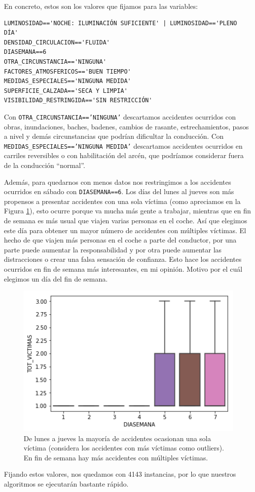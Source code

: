 \documentclass[oneside]{book}
\begin{document}
En concreto, estos son los valores que fijamos para las variables:

\begin{verbatim}
LUMINOSIDAD=='NOCHE: ILUMINACIÓN SUFICIENTE' | LUMINOSIDAD=='PLENO DÍA'
DENSIDAD_CIRCULACION=='FLUIDA'
DIASEMANA==6
OTRA_CIRCUNSTANCIA=='NINGUNA'
FACTORES_ATMOSFERICOS=='BUEN TIEMPO'
MEDIDAS_ESPECIALES=='NINGUNA MEDIDA'
SUPERFICIE_CALZADA=='SECA Y LIMPIA'
VISIBILIDAD_RESTRINGIDA=='SIN RESTRICCIÓN'
\end{verbatim}

Con \texttt{OTRA\_CIRCUNSTANCIA=='NINGUNA'} descartamos accidentes
ocurridos con obras, inundaciones, baches, badenes, cambios de
rasante, estrechamientos, pasos a nivel y demás circunstancias que
podrían dificultar la conducción. Con
\texttt{MEDIDAS\_ESPECIALES=='NINGUNA MEDIDA'} descartamos accidentes
ocurridos en carriles reversibles o con habilitación del arcén, que
podríamos considerar fuera de la conducción ``normal''.

Además, para quedarnos con menos datos nos restringimos a los
accidentes ocurridos en sábado con \texttt{DIASEMANA==6}. Los días del
lunes al jueves son más propensos a presentar accidentes con una sola
víctima (como apreciamos en la Figura \ref{fig:diasemana}), esto ocurre
porque va mucha más gente a trabajar, mientras que en fin de semana es
más usual que viajen varias personas en el coche. Así que elegimos
este día para obtener un mayor número de accidentes con múltiples
víctimas. El hecho de que viajen más personas en el coche a parte del
conductor, por una parte puede aumentar la responsabilidad y por otra
puede aumentar las distracciones o crear una falsa sensación de
confianza. Esto hace los accidentes ocurridos en fin de semana más
interesantes, en mi opinión. Motivo por el cuál elegimos un día del
fin de semana.

\begin{figure}[H]
  \centering
  \includegraphics[width=140mm]{figures/accidentes/diasemana}
  \caption{De lunes a jueves la mayoría de accidentes ocasionan una
    sola víctima (considera los accidentes con más víctimas como
    outliers). En fin de semana hay más accidentes con múltiples
    víctimas.}
  \label{fig:diasemana}
\end{figure}
\vspace{-5mm}
Fijando estos valores, nos quedamos con 4143 instancias, por lo que
nuestros algoritmos se ejecutarán bastante rápido.
\end{document}
